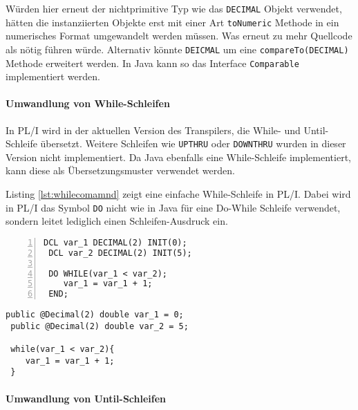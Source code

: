 Würden hier erneut der nichtprimitive Typ wie das \verb+DECIMAL+ Objekt verwendet, hätten die instanziierten Objekte erst mit einer Art \verb+toNumeric+ Methode in ein numerisches Format umgewandelt werden müssen. Was erneut zu mehr Quellcode als nötig führen würde. Alternativ könnte \verb+DEICMAL+ um eine \verb+compareTo(DECIMAL)+ Methode erweitert werden. In Java kann so das Interface \verb+Comparable+ implementiert werden. 

\paragraph{Umwandlung von While-Schleifen}
In PL/I wird in der aktuellen Version des Transpilers, die  While- und Until-Schleife übersetzt.
Weitere Schleifen wie \verb+UPTHRU+ oder \verb+DOWNTHRU+ wurden in dieser Version nicht implementiert.
Da Java ebenfalls eine While-Schleife implementiert, kann diese als Übersetzungsmuster verwendet werden. 


Listing \ref{lst:whilecomamnd} zeigt eine einfache While-Schleife in PL/I.
Dabei wird in PL/I das Symbol \verb+DO+ nicht wie in Java für eine Do-While
Schleife verwendet, sondern leitet lediglich einen Schleifen-Ausdruck ein.

\begin{minipage}[b]{0.48\linewidth}
	\centering
	\lstset{language=PL/I,label=SliceExaple}
	\begin{lstlisting}[frame=single, numbers=left, mathescape,%
		caption={While-Schleife}, label={lst:whilecomamnd}, basicstyle=\fontsize{9}{13}\selectfont\ttfamily]
 DCL var_1 DECIMAL(2) INIT(0);
 DCL var_2 DECIMAL(2) INIT(5);
 
 DO WHILE(var_1 < var_2);
 	var_1 = var_1 + 1;
 END;
	\end{lstlisting}
\end{minipage}
\hspace{0.5cm}
\begin{minipage}[b]{0.48\linewidth}
	\centering
	\lstset{language=Java,label=SliceExaple}
	\begin{lstlisting}[frame=single, mathescape,%
		title={" "}, basicstyle=\fontsize{9}{13}\selectfont\ttfamily]
 public @Decimal(2) double var_1 = 0;
 public @Decimal(2) double var_2 = 5;

 while(var_1 < var_2){
 	var_1 = var_1 + 1;
 }
	\end{lstlisting}
\end{minipage} 
\pagebreak
\paragraph{Umwandlung von Until-Schleifen}

